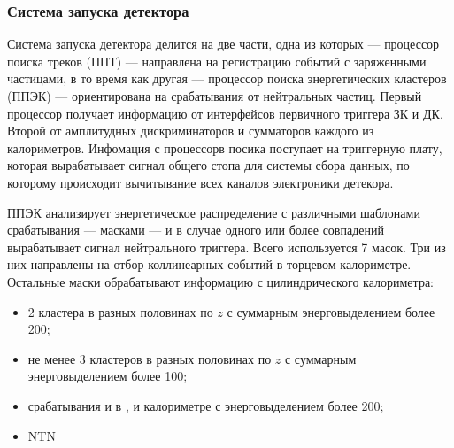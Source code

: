 %




\subsubsection{Система запуска детектора}\label{sec:trigger}

Система запуска детектора делится на две части,
одна из которых --- процессор поиска треков (ППТ) --- направлена на регистрацию событий с заряженными частицами,
в то время как другая --- процессор поиска энергетических кластеров (ППЭК) --- ориентирована на срабатывания от нейтральных частиц.
Первый процессор получает информацию от интерфейсов первичного триггера ЗК и ДК.
Второй от амплитудных дискриминаторов и сумматоров каждого из калориметров.
Инфомация с процессорв посика поступает на триггерную плату,
которая вырабатывает сигнал общего стопа для системы сбора данных,
по которому происходит вычитывание всех каналов электроники детекора.

ППЭК анализирует энергетическое распределение с различными шаблонами срабатывания --- масками ---
и в случае одного или более совпадений вырабатывает сигнал нейтрального триггера.
Всего используется 7 масок.
Три из них направлены на отбор коллинеарных событий в торцевом калориметре.
Остальные маски обрабатывают информацию с цилиндрического калориметра:
\begin{itemize}
    \item 2 кластера в разных половинах по $z$ с суммарным энерговыделением более \SI{200}{\MeVr};
    \item не менее 3 кластеров в разных половинах по $z$ с суммарным энерговыделением более \SI{100}{\MeVr};
    \item срабатывания и в , и  калориметре с энерговыделением более \SI{200}{\MeVr};
    \item NTN
\end{itemize}







